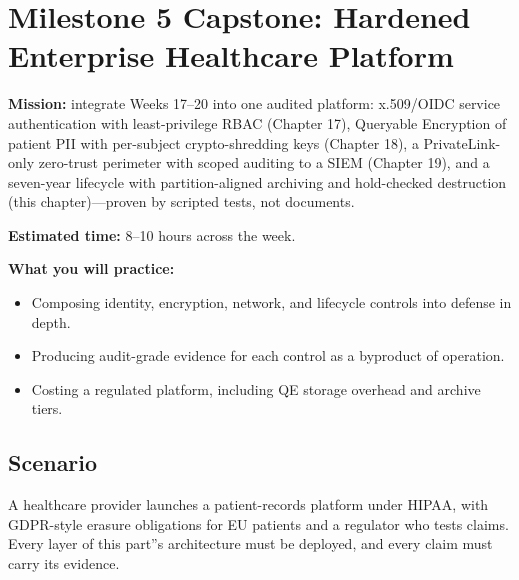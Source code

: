 \section{Milestone 5 Capstone: Hardened Enterprise Healthcare Platform}\label{sec:ch20-capstone}

\begin{capstonebox}
\textbf{Mission:} integrate Weeks 17--20 into one audited platform: x.509/OIDC service authentication with least-privilege RBAC (Chapter 17), Queryable Encryption of patient PII with per-subject crypto-shredding keys (Chapter 18), a PrivateLink-only zero-trust perimeter with scoped auditing to a SIEM (Chapter 19), and a seven-year lifecycle with partition-aligned archiving and hold-checked destruction (this chapter)---proven by scripted tests, not documents.

\textbf{Estimated time:} 8--10 hours across the week.

\textbf{What you will practice:}
\begin{itemize}
    \item Composing identity, encryption, network, and lifecycle controls into defense in depth.
    \item Producing audit-grade evidence for each control as a byproduct of operation.
    \item Costing a regulated platform, including QE storage overhead and archive tiers.
\end{itemize}
\end{capstonebox}

\subsection*{Scenario}
A healthcare provider launches a patient-records platform under HIPAA, with GDPR-style erasure obligations for EU patients and a regulator who tests claims. Every layer of this part''s architecture must be deployed, and every claim must carry its evidence.

